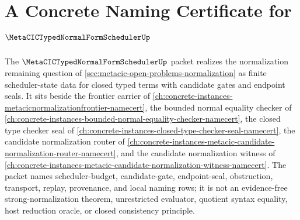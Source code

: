 \chapter{A Concrete Naming Certificate for $\MetaCICTypedNormalFormSchedulerUp$}
\label{ch:concrete-instances-metacic-typed-normal-form-scheduler-namecert}

The $\MetaCICTypedNormalFormSchedulerUp$ packet realizes the normalization remaining question of \autoref{sec:metacic-open-problems-normalization} as finite scheduler-state data for closed typed terms with candidate gates and endpoint seals. It sits beside the frontier carrier of \autoref{ch:concrete-instances-metacicnormalizationfrontier-namecert}, the bounded normal equality checker of \autoref{ch:concrete-instances-bounded-normal-equality-checker-namecert}, the closed type checker seal of \autoref{ch:concrete-instances-closed-type-checker-seal-namecert}, the candidate normalization router of \autoref{ch:concrete-instances-metacic-candidate-normalization-router-namecert}, and the candidate normalization witness of \autoref{ch:concrete-instances-metacic-candidate-normalization-witness-namecert}. The packet names scheduler-budget, candidate-gate, endpoint-seal, obstruction, transport, replay, provenance, and local naming rows; it is not an evidence-free strong-normalization theorem, unrestricted evaluator, quotient syntax equality, host reduction oracle, or closed consistency principle.

